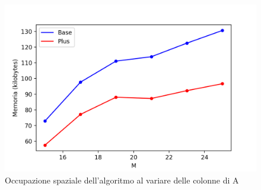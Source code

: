 \begin{figure}[h!]
\centering
\includegraphics[width=0.8\linewidth]{figures/random/r_m_mem.png}
\caption{Occupazione spaziale dell'algoritmo al variare delle colonne di A}
\label{row:mem:r}
\end{figure}